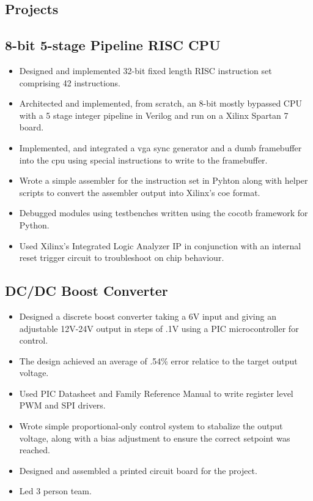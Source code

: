 \documentclass{article}
\begin{document}
\begin{spacing}{.5}
\section{Projects}
	\subsection{8-bit 5-stage Pipeline RISC CPU \hfill {}}
		\begin{itemize}[label=--,itemsep=-.35ex]
			\item \large{Designed and implemented 32-bit fixed length RISC instruction set comprising 42 instructions.}
			\item \large{Architected and implemented, from scratch, an 8-bit mostly bypassed CPU with a 5 stage integer pipeline in Verilog and run on a Xilinx Spartan 7 board.}
			\item \large{Implemented, and integrated a vga sync generator and a dumb framebuffer into the cpu using special instructions to write to the framebuffer.}
			\item \large{Wrote a simple assembler for the instruction set in Pyhton along with helper scripts to convert the assembler output into Xilinx's coe format.}
			\item \large{Debugged modules using testbenches written using the cocotb framework for Python.}
			\item \large{Used Xilinx's Integrated Logic Analyzer IP in conjunction with an internal reset trigger circuit to troubleshoot on chip behaviour.}
		\end{itemize}
	\subsection{DC/DC Boost Converter \hfill {}}
		\begin{itemize}[label=--,itemsep=-.35ex]
			\item \large{Designed a discrete boost converter taking a 6V input and giving an adjustable 12V-24V output in steps of .1V using a PIC microcontroller for control.}
			\item \large{The design achieved an average of .54\% error relatice to the target output voltage.}
			\item \large{Used PIC Datasheet and Family Reference Manual to write register level PWM and SPI drivers.}
			\item \large{Wrote simple proportional-only control system to stabalize the output voltage, along with a bias adjustment to ensure the correct setpoint was reached.}
			\item \large{Designed and assembled a printed circuit board for the project.}
			\item \large{Led 3 person team.}
		\end{itemize}

\end{spacing}
\end{document}
